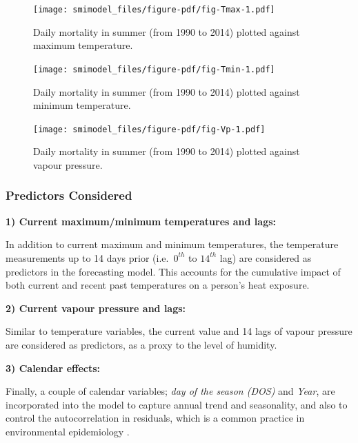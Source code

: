 \documentclass[11pt,a4paper,]{article}
\begin{document}
\begin{figure}

{\centering \texttt{[image: smimodel\_files/figure-pdf/fig-Tmax-1.pdf]}

}

\caption{\label{fig-Tmax}Daily mortality in summer (from 1990 to 2014)
plotted against maximum temperature.}

\end{figure}

\begin{figure}

{\centering \texttt{[image: smimodel\_files/figure-pdf/fig-Tmin-1.pdf]}

}

\caption{\label{fig-Tmin}Daily mortality in summer (from 1990 to 2014)
plotted against minimum temperature.}

\end{figure}

\begin{figure}

{\centering \texttt{[image: smimodel\_files/figure-pdf/fig-Vp-1.pdf]}

}

\caption{\label{fig-Vp}Daily mortality in summer (from 1990 to 2014)
plotted against vapour pressure.}

\end{figure}

\hypertarget{predictors-considered}{%
\subsubsection{Predictors Considered}\label{predictors-considered}}

\textbf{1) Current maximum/minimum temperatures and lags:}

In addition to current maximum and minimum temperatures, the temperature
measurements up to 14 days prior (i.e.~\(0^{th}\) to \(14^{th}\) lag)
are considered as predictors in the forecasting model. This accounts for
the cumulative impact of both current and recent past temperatures on a
person's heat exposure.

\textbf{2) Current vapour pressure and lags:}

Similar to temperature variables, the current value and 14 lags of
vapour pressure are considered as predictors, as a proxy to the level of
humidity.

\textbf{3) Calendar effects:}

Finally, a couple of calendar variables; \emph{day of the season (DOS)}
and \emph{Year}, are incorporated into the model to capture annual trend
and seasonality, and also to control the autocorrelation in residuals,
which is a common practice in environmental epidemiology
\autocite{Masselot2022}.
\end{document}
